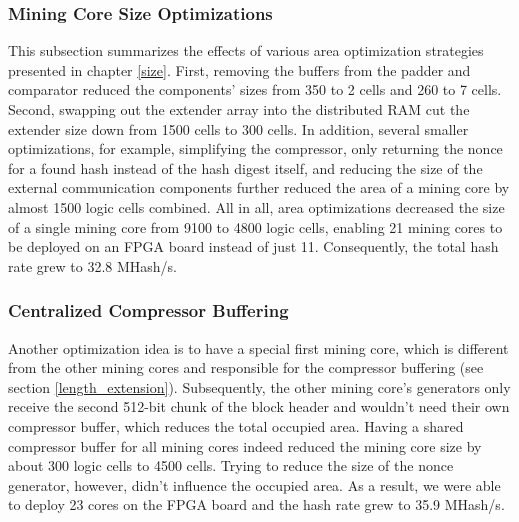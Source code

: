 \subsubsection*{Mining Core Size Optimizations}
This subsection summarizes the effects of various area optimization strategies presented in chapter \ref{size}. First, removing the buffers from the padder and comparator reduced the components' sizes from 350 to 2 cells and 260 to 7 cells. Second, swapping out the extender array into the distributed RAM cut the extender size down from 1500 cells to 300 cells. In addition, several smaller optimizations, for example, simplifying the compressor, only returning the nonce for a found hash instead of the hash digest itself, and reducing the size of the external communication components further reduced the area of a mining core by almost 1500 logic cells combined. All in all, area optimizations decreased the size of a single mining core from 9100 to 4800 logic cells, enabling 21 mining cores to be deployed on an FPGA board instead of just 11. Consequently, the total hash rate grew to 32.8 MHash/s.



\subsubsection*{Centralized Compressor Buffering}
Another optimization idea is to have a special first mining core, which is different from the other mining cores and responsible for the compressor buffering (see section \ref{length_extension}). Subsequently, the other mining core's generators only receive the second 512-bit chunk of the block header and wouldn't need their own compressor buffer, which reduces the total occupied area. Having a shared compressor buffer for all mining cores indeed reduced the mining core size by about 300 logic cells to 4500 cells. Trying to reduce the size of the nonce generator, however, didn't influence the occupied area. As a result, we were able to deploy 23 cores on the FPGA board and the hash rate grew to 35.9 MHash/s.


